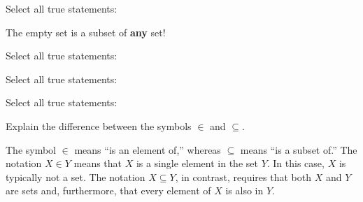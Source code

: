 \documentclass[nooutcomes]{ximera}
\begin{document}
\begin{problem}
Select all true statements: 
\begin{selectAll}
\end{selectAll}
\begin{feedback}[incorrect]
The empty set is a subset of \textbf{any} set!  
\end{feedback}
\begin{problem}
Select all true statements: 
\begin{selectAll}
\end{selectAll}
\end{problem}
\end{problem}

\begin{problem}
Select all true statements: 
\begin{selectAll}
\end{selectAll}
\begin{problem}
Select all true statements: 
\begin{selectAll}
\end{selectAll}
\end{problem}
\end{problem}

\begin{problem}
Explain the difference between the symbols $\in$ and $\subseteq$.
\begin{freeResponse}
\begin{hint}
The symbol $\in$ means ``is an element of,'' whereas $\subseteq$ means ``is a subset of.'' 
The notation $X \in Y$ means that $X$ is a single element in the set $Y$.  In this case, $X$ is typically not a set.  The notation $X \subseteq Y$, in contrast, requires that both $X$ and $Y$ are sets and, furthermore, that every element of $X$ is also in $Y$.
\end{hint}
\end{freeResponse}
\end{problem}
\end{document}
